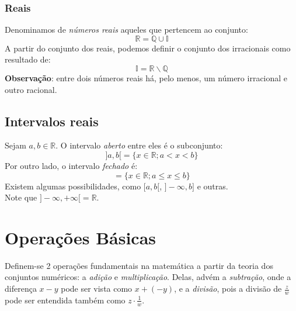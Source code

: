 \documentclass[13pt,letterpaper]{article}
\begin{document}
\subsubsection{Reais}
Denominamos de \emph{números reais} aqueles que pertencem ao conjunto:
\begin{displaymath}
    \mathbb{R} = \mathbb{Q} \cup \mathbb{I}
\end{displaymath}
A partir do conjunto dos reais, podemos definir o conjunto dos irracionais como resultado de:
\begin{displaymath}
    \mathbb{I} = \mathbb{R} \backslash \mathbb{Q}
\end{displaymath}
\textbf{Observação}: entre dois números reais há, pelo menos, um número irracional e outro racional.

\subsection{Intervalos reais}
Sejam $a, b \in \mathbb{R}$. O intervalo \emph{aberto} entre eles é o subconjunto:
\begin{displaymath}
    ]a, b[ = \{ x \in \mathbb{R}; a < x < b\}
\end{displaymath}
Por outro lado, o intervalo \emph{fechado} é:
\begin{displaymath}
    [a, b] = \{ x \in \mathbb{R}; a \leq x \leq b\}
\end{displaymath}
Existem algumas possibilidades, como $[a, b[$, $] - \infty, b] $ e outras. \\ Note que $ ]-\infty, +\infty [ = \mathbb{R}$.

\newpage

\section{Operações Básicas}
Definem-se 2 operações fundamentais na matemática a partir da teoria dos conjuntos numéricos: a \emph{adição} e \emph{multiplicação}. Delas, advém a \emph{subtração}, onde a diferença $x - y$ pode ser vista como $x + (-y)$, e a \emph{divisão}, pois a divisão de $\frac{z}{w}$ pode ser entendida também como $z \cdot \frac{1}{w}$.
\end{document}
